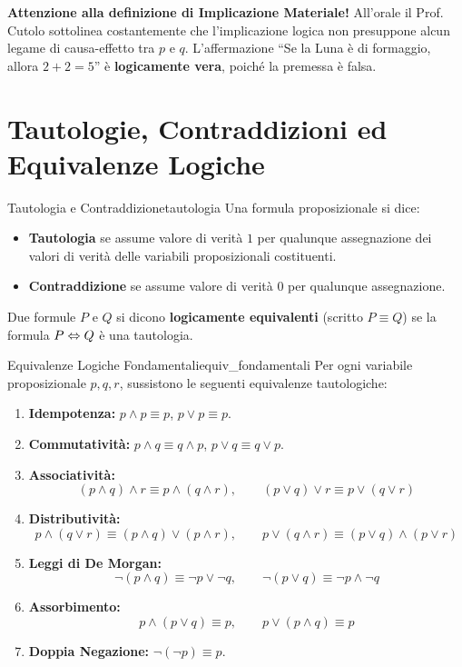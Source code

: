 \begin{avvisoCutolo}
    \textbf{Attenzione alla definizione di Implicazione Materiale!}
    All'orale il Prof. Cutolo sottolinea costantemente che l'implicazione logica non presuppone alcun legame di causa-effetto tra $p$ e $q$. L'affermazione ``Se la Luna è di formaggio, allora $2+2=5$'' è \textbf{logicamente vera}, poiché la premessa è falsa.
\end{avvisoCutolo}

\section{Tautologie, Contraddizioni ed Equivalenze Logiche}

\begin{definizione}{Tautologia e Contraddizione}{tautologia}
Una formula proposizionale si dice:
\begin{itemize}
    \item \textbf{Tautologia} se assume valore di verità $1$ per qualunque assegnazione dei valori di verità delle variabili proposizionali costituenti.
    \item \textbf{Contraddizione} se assume valore di verità $0$ per qualunque assegnazione.
\end{itemize}
Due formule $P$ e $Q$ si dicono \textbf{logicamente equivalenti} (scritto $P \equiv Q$) se la formula $P \Leftrightarrow Q$ è una tautologia.
\end{definizione}

\begin{teorema}{Equivalenze Logiche Fondamentali}{equiv_fondamentali}
Per ogni variabile proposizionale $p, q, r$, sussistono le seguenti equivalenze tautologiche:
\begin{enumerate}
    \item \textbf{Idempotenza:} $p \wedge p \equiv p$, \quad $p \vee p \equiv p$.
    \item \textbf{Commutatività:} $p \wedge q \equiv q \wedge p$, \quad $p \vee q \equiv q \vee p$.
    \item \textbf{Associatività:} 
    \[
        (p \wedge q) \wedge r \equiv p \wedge (q \wedge r), \qquad (p \vee q) \vee r \equiv p \vee (q \vee r)
    \]
    \item \textbf{Distributività:}
    \[
        p \wedge (q \vee r) \equiv (p \wedge q) \vee (p \wedge r), \qquad p \vee (q \wedge r) \equiv (p \vee q) \wedge (p \vee r)
    \]
    \item \textbf{Leggi di De Morgan:}
    \[
        \neg(p \wedge q) \equiv \neg p \vee \neg q, \qquad \neg(p \vee q) \equiv \neg p \wedge \neg q
    \]
    \item \textbf{Assorbimento:}
    \[
        p \wedge (p \vee q) \equiv p, \qquad p \vee (p \wedge q) \equiv p
    \]
    \item \textbf{Doppia Negazione:} $\neg(\neg p) \equiv p$.
\end{enumerate}
\end{teorema}

